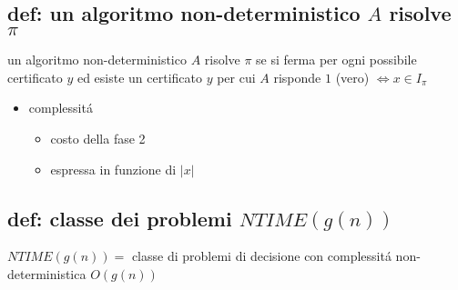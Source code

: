 \subsection*{\color{cyan} def: un algoritmo non-deterministico $A$ risolve $\pi$}
\begin{flushleft}
	un algoritmo non-deterministico $A$ risolve $\pi$ se si ferma per ogni possibile certificato $y$ ed esiste un certificato $y$ per cui $A$ risponde $1$ (vero) $\iff x\in I_{\pi}$
	\begin{itemize}
		\item complessit\'a
		\begin{itemize}
			\item costo della fase 2
			\item espressa in funzione di $|x|$
		\end{itemize}
	\end{itemize}
\end{flushleft}


\subsection*{\color{cyan} def: classe dei problemi $NTIME(g(n))$}
\begin{flushleft}
	$NTIME(g(n))=$ classe di problemi di decisione con complessit\'a non-deterministica $O(g(n))$
\end{flushleft}


